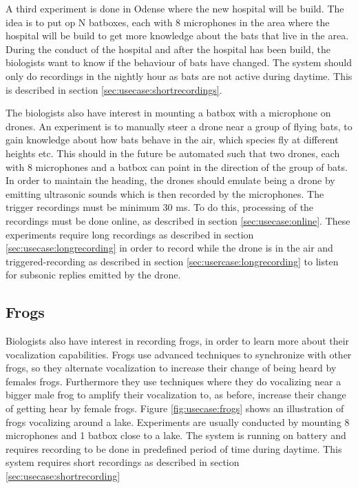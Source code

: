 A third experiment is done in Odense where the new hospital will be build.
The idea is to put op N batboxes, each with 8 microphones in the area where the hospital will be build to get more knowledge about the bats that live in the area. During the conduct of the hospital and after the hospital has been build, the biologists want to know if the behaviour of bats have changed. The system should only do recordings in the nightly hour as bats are not active during daytime. This is described in section \ref{sec:usecase:shortrecordings}.

The biologists also have interest in mounting a batbox with a microphone on drones. An experiment is to manually steer a drone near a group of flying bats, to gain knowledge about how bats behave in the air, which species fly at different heights etc. This should in the future be automated such that two drones, each with 8 microphones and a batbox can point in the direction of the group of bats. In order to maintain the heading, the drones should emulate being a drone by emitting ultrasonic sounds which is then recorded by the microphones. The trigger recordings must be minimum 30 ms. To do this, processing of the recordings must be done online, as described in section \ref{sec:usecase:online}.
These experiments require long recordings as described in section \ref{sec:usecase:longrecording} in order to record while the drone is in the air and triggered-recording as described in section \ref{sec:usercase:longrecording} to listen for subsonic replies emitted by the drone.

\subsection{Frogs}
Biologists also have interest in recording frogs, in order to learn more about their vocalization capabilities. Frogs use advanced techniques to synchronize with other frogs, so they alternate vocalization to increase their change of being heard by females frogs. Furthermore they use techniques where they do vocalizing near a bigger male frog to amplify their vocalization to, as before, increase their change of getting hear by female frogs. Figure \ref{fig:usecase:frogs} shows an illustration of frogs vocalizing around a lake. Experiments are usually conducted by mounting 8 microphones and 1 batbox close to a lake. The system is running on battery and requires recording to be done in predefined period of time during daytime. This system requires short recordings as described in section \ref{sec:usecase:shortrecording}


